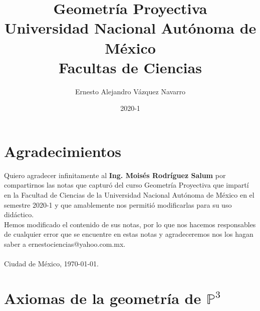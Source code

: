 \documentclass[12pt]{book}
\theoremstyle{definition}
\newcommand{\p}{\mathbb P}
\begin{document}
\title{\textbf{Geometría Proyectiva} \\ \vspace{1cm} \Large{Universidad Nacional Autónoma de México \\ Facultas de Ciencias}}
\date{2020-1}
\author{Ernesto Alejandro Vázquez Navarro}
\maketitle

\tableofcontents

\chapter*{Agradecimientos}

Quiero agradecer infinitamente al \textbf{Ing. Moisés Rodríguez Salum} por compartirnos las notas que capturó del curso Geometría Proyectiva que impartí en la Facultad de Ciencias de la Universidad Nacional Autónoma de México en el semestre 2020-1 y que amablemente nos permitió modificarlas para su uso didáctico. \\

Hemos modificado el contenido de sus notas, por lo que nos hacemos responsables de cualquier error que se encuentre en estas notas y agradeceremos nos los hagan saber a ernestociencias@yahoo.com.mx. \\ \\

Ciudad de México, \today.

\chapter{Axiomas de la geometría de $\p^3$}
\end{document}
